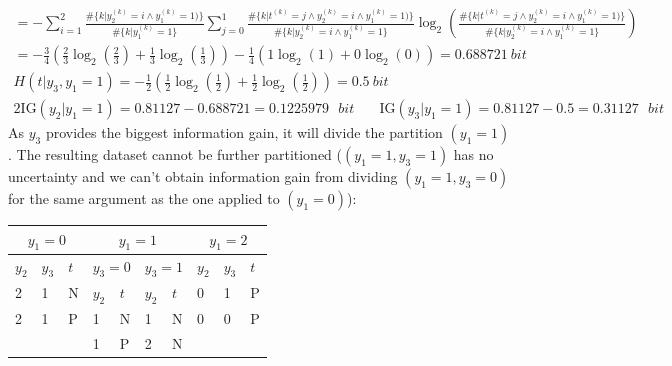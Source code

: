 \documentclass{exam}
\begin{document}
\begin{questions}
\begin{gather*}
                = - \sum_{i = 1}^{2}  \frac{\#\{k|y_2^{(k)} = i \wedge y_1^{(k)} = 1)\}}{\#\{k|y_1^{(k)} = 1\}} \sum_{j = 0}^{1}  \frac{\#\{k|t^{(k)} = j \wedge y_2^{(k)} = i \wedge y_1^{(k) } = 1)\}}{\#\{k|y_2^{(k)} = i \wedge y_1^{(k)} = 1\}} \log_2\left(\frac{\#\{k|t^{(k)} = j \wedge y_2^{(k)} = i \wedge y_1^{(k) } = 1)\}}{\#\{k|y_2^{(k)} = i \wedge y_1^{(k)} = 1\}}\right) \\
                = - \frac{3}{4}\left( \frac{2}{3}\log_2\left(\frac{2}{3}\right) + \frac{1}{3}\log_2\left(\frac{1}{3}\right)\right) - \frac{1}{4} \left( 1\log_2(1) + 0\log_2(0)\right) 
                = 0.688721 \medspace bit\\
            H(t|y_3, y_1 = 1)
                = - \frac{1}{2}\left( \frac{1}{2}\log_2\left(\frac{1}{2}\right) + \frac{1}{2}\log_2\left(\frac{1}{2}\right)\right)
                =  0.5 \medspace bit
        \end{gather*}
        \vspace{-1.5em}
        \begin{alignat*}{2}
            \text{IG}(y_2|y_1 = 1) = 0.81127 - 0.688721  = 0.1225979 \text{ }bit \quad & \text{IG}(y_3|y_1 = 1) = 0.81127 - 0.5  = 0.31127 \text{ }bit 
        \end{alignat*}
        As $y_3$ provides the biggest information gain, it will divide the partition $(y_1 = 1)$. The resulting dataset cannot be further partitioned ($(y_1 = 1, y_3 = 1)$ has no uncertainty and we can't obtain information gain from dividing $(y_1 = 1, y_3 = 0)$ for the same argument as the one applied to $(y_1 = 0)$):
        \begin{table}[H]
            \centering
            \begin{tabular}{lll|ll|ll|lll}
            \multicolumn{3}{c|}{$y_1  = 0$} & \multicolumn{4}{c|}{$y_1 = 1$}                                  & \multicolumn{3}{c|}{$y_1 = 2$} \\ \hline
            $y_2$     & $y_3$     & $t$     & \multicolumn{2}{l|}{$y_3 = 0$} & \multicolumn{2}{l|}{$y_3 = 1$} & $y_2$     & $y_3$     & $t$    \\ \hline
            2         & 1         & N       & $y_2$           & $t$          & $y_2$           & $t$          & 0         & 1         & P      \\ \cline{4-7}
            2         & 1         & P       & 1               & N            & 1               & N            & 0         & 0         & P      \\
                      &           &         & 1               & P            & 2               & N            &           &           &       

\end{tabular}
\end{table}
\end{questions}
\end{document}
